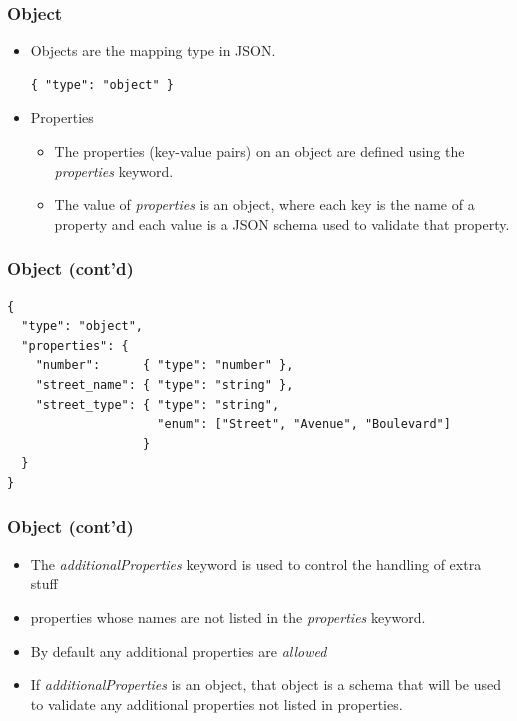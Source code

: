 \documentclass{efd-lecture}
\begin{document}
\begin{frame}[fragile]
  \frametitle{Object}
  \begin{itemize}
    \item Objects are the mapping type in JSON.
    \begin{verbatim}
{ "type": "object" }
    \end{verbatim}
    \item Properties
    \begin{itemize}
      \item
        The properties (key-value pairs) on an object are defined using the
        \textit{\color{YellowOrange}properties} keyword.
      \item
        The value of \textit{\color{YellowOrange}properties} is an object,
        where each key is the name of a property and each value is a JSON
        schema used to validate that property.
    \end{itemize}
  \end{itemize}
\end{frame}

\begin{frame}[fragile]
  \frametitle{Object (cont'd)}
  \begin{verbatim}
{
  "type": "object",
  "properties": {
    "number":      { "type": "number" },
    "street_name": { "type": "string" },
    "street_type": { "type": "string",
                     "enum": ["Street", "Avenue", "Boulevard"]
                   }
  }
}
  \end{verbatim}
\end{frame}

\begin{frame}
  \frametitle{Object (cont'd)}
  \begin{itemize}
    \item
      The \textit{\color{Purple}additionalProperties} keyword is used
      to control the handling of extra stuff

    \item
      properties whose names are not listed in the
      \textit{\color{YellowOrange}properties} keyword.

    \item
      By default any additional properties are
      \textit{\color{LimeGreen}allowed}

    \item
      If \textit{\color{Purple}additionalProperties} is an object,
      that object is a schema that will be used to validate any additional
      properties not listed in properties.

  \end{itemize}
\end{frame}
\end{document}
